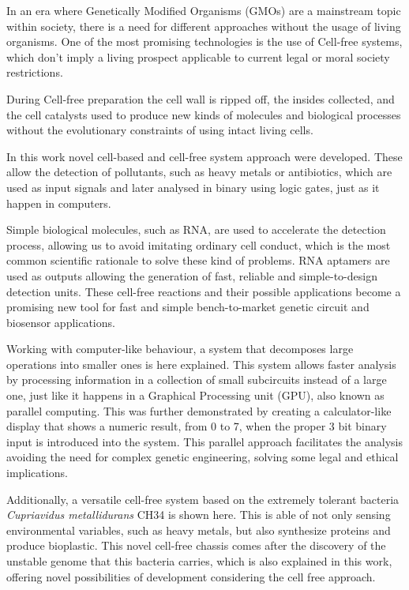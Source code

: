 In an era where Genetically Modified Organisms (GMOs) are a mainstream topic within society,
there is a need for different approaches without the usage of living organisms. One of the 
most promising technologies is the use of Cell-free systems, which don't imply a living prospect
applicable to current legal or moral society restrictions.

During Cell-free preparation the cell wall is ripped off, the insides collected, and the cell
catalysts used to produce new kinds of molecules and biological processes without the evolutionary
constraints of using intact living cells.

In this work novel cell-based and cell-free system approach were developed. These allow the detection
of pollutants, such as heavy metals or antibiotics, which are used as input signals and later analysed
in binary using logic gates, just as it happen in computers. 

Simple biological molecules, such as RNA, are used to accelerate the detection process, allowing us to
avoid imitating ordinary cell conduct, which is the most common scientific rationale to solve these kind 
of problems. RNA aptamers are used as outputs allowing the generation of fast, reliable and simple-to-design
detection units. These cell-free reactions and their possible applications become a promising new tool for
fast and simple bench-to-market genetic circuit and biosensor applications.

Working with computer-like behaviour, a system that decomposes large operations into smaller ones is here explained.
This system allows faster analysis by processing information in a collection of small subcircuits instead of a large
one, just like it happens in a Graphical Processing  unit (GPU), also known as parallel computing. This was further 
demonstrated by creating a calculator-like display that shows a numeric result, from 0 to 7, when the proper 3 bit 
binary input is introduced into the system. This parallel approach facilitates the analysis avoiding the need for 
complex genetic engineering, solving some legal and ethical implications.

Additionally, a versatile cell-free system based on the extremely tolerant bacteria \textit{Cupriavidus  metallidurans} CH34
is shown here. This is able of not only sensing environmental variables, such as heavy metals, but also synthesize proteins
and produce bioplastic. This novel cell-free chassis comes after the discovery of the unstable genome that this bacteria carries,
which is also explained in this work, offering novel possibilities of development considering the cell free approach.